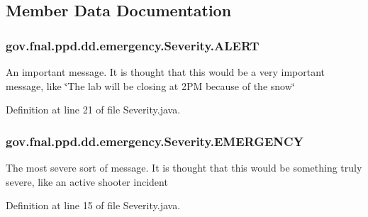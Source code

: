 \subsection{Member Data Documentation}
\hypertarget{enumgov_1_1fnal_1_1ppd_1_1dd_1_1emergency_1_1Severity_ab2b0f7c4e6222e22432f49393a71091c}{
\subsubsection[{A\-L\-E\-R\-T}]{\setlength{\rightskip}{0pt plus 5cm}gov.\-fnal.\-ppd.\-dd.\-emergency.\-Severity.\-A\-L\-E\-R\-T}}\label{enumgov_1_1fnal_1_1ppd_1_1dd_1_1emergency_1_1Severity_ab2b0f7c4e6222e22432f49393a71091c}
An important message. It is thought that this would be a very important message, like \char`\"{}\-The lab will be closing at 2\-P\-M because of the snow\char`\"{} 

Definition at line 21 of file Severity.\-java.

\hypertarget{enumgov_1_1fnal_1_1ppd_1_1dd_1_1emergency_1_1Severity_a611bc0cf1463a7419a9d2cd14c683578}{
\subsubsection[{E\-M\-E\-R\-G\-E\-N\-C\-Y}]{\setlength{\rightskip}{0pt plus 5cm}gov.\-fnal.\-ppd.\-dd.\-emergency.\-Severity.\-E\-M\-E\-R\-G\-E\-N\-C\-Y}}\label{enumgov_1_1fnal_1_1ppd_1_1dd_1_1emergency_1_1Severity_a611bc0cf1463a7419a9d2cd14c683578}
The most severe sort of message. It is thought that this would be something truly severe, like an active shooter incident 

Definition at line 15 of file Severity.\-java.

